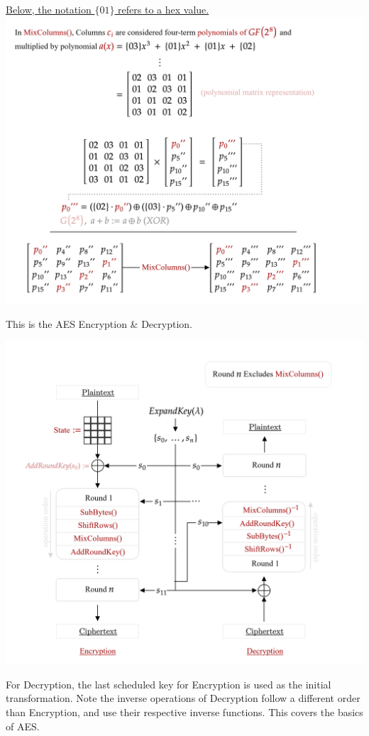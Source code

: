 \noindent
\underline{Below, the notation $\{01\}$ refers to a hex value.}\\

\vspace{-1em}
\hspace{-3em}
\includegraphics[width=1.1\textwidth]{Sections/sec/enc/aes/trans/mix.png}

\newpage

\noindent
This is the AES Encryption \& Decryption.

\includegraphics[width=1.1\textwidth]{Sections/sec/enc/aes/trans/ende.png}

\vspace{1em}
\noindent
For Decryption, the last scheduled key for Encryption is used as the initial transformation. Note the inverse 
operations of Decryption follow a different order than Encryption, and use 
their respective inverse functions. This covers the basics of AES.
